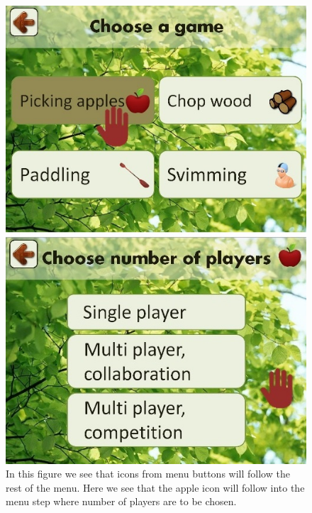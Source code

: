 \begin{figure} [H]
\centering
\includegraphics[scale=0.5]{menuIconApple.jpg}
\caption[Menu - use of icons]{In this figure we see that icons from menu buttons will follow the rest of the menu. Here we see that the apple icon will follow into the menu step where number of players are to be chosen.}
\label{fig:iconEple}
\end{figure} 
     
